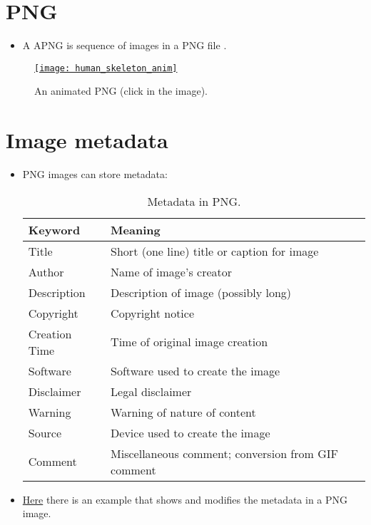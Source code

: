 \section{ PNG}
\begin{itemize}
\item A \gls{APNG} is sequence of images in a \gls{PNG} file
  \cite{wikipedia_APNG}.
\end{itemize}
\begin{figure}[H]
  \vspace{-2ex}
  \centering
  \href{https://commons.wikimedia.org/wiki/Category:Animated_PNG_files#/media/File:201805_human_skeleton_anim.png}{\texttt{[image: human\_skeleton\_anim]}}
  \caption{An animated \gls{PNG} (click in the image).}
  \label{fig:PNG_animated}
\end{figure}

\section{Image metadata}
\begin{itemize}
\item \gls{PNG} images can store metadata:
  \begin{table}[!h]
    \vspace{2ex}
    \begin{center}
      \begin{tabular}{l|l}
        Keyword & Meaning\\
        \hline
        Title & Short (one line) title or caption for image \\
        Author & Name of image's creator \\
        Description & Description of image (possibly long) \\
        Copyright & Copyright notice \\
        Creation Time & Time of original image creation \\
        Software & Software used to create the image \\
        Disclaimer & Legal disclaimer \\
        Warning & Warning of nature of content \\
        Source & Device used to create the image \\
        Comment & Miscellaneous comment; conversion from GIF comment
      \end{tabular}
    \end{center}
    \caption{Metadata in PNG.}
    \label{tab:meta_PNG}
  \end{table}
\end{itemize}

\begin{itemize}
\item
  \href{https://github.com/vicente-gonzalez-ruiz/medical_imaging/blob/main/notebooks/PNG_add_metadata.ipynb}{Here}
  there is an example that shows and modifies the metadata in a PNG
  image.
\end{itemize}
